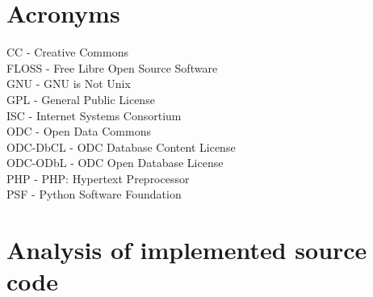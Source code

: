 \documentclass[11pt]{article}
\begin{document}
\section{Acronyms}

CC  - Creative Commons\\
FLOSS - Free Libre Open Source Software\\
GNU - GNU is Not Unix\\
GPL - General Public License\\
ISC - Internet Systems Consortium\\
ODC - Open Data Commons\\
ODC-DbCL - ODC Database Content License\\
ODC-ODbL - ODC Open Database License\\
PHP - PHP: Hypertext Preprocessor\\
PSF - Python Software Foundation

\section{Analysis of implemented source code}
\end{document}
